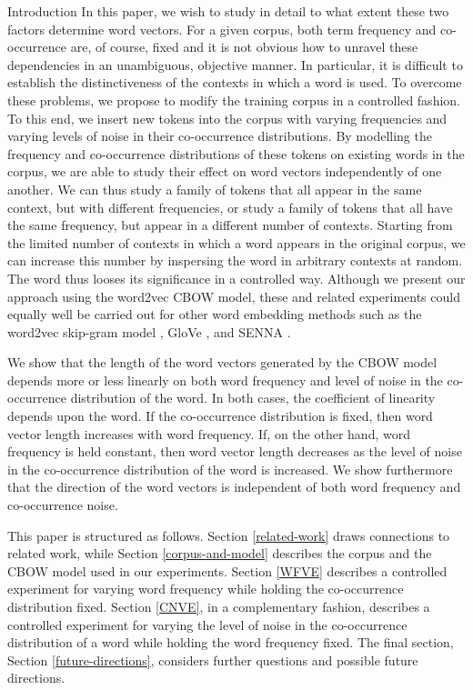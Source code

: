 \documentclass{article} %
\begin{document}
\begin{section}{Introduction}
In this paper, we wish to study in detail to what extent these two
factors determine word vectors.  For a given corpus, both term
frequency and co-occurrence are, of course, fixed and it is not obvious
how to unravel these dependencies in an unambiguous, objective manner.
In particular, it is difficult to establish the distinctiveness of the
contexts in which a word is used.  To overcome these problems, we
propose to modify the training corpus in a controlled fashion.  To
this end, we insert new tokens into the corpus with varying frequencies
and varying levels of noise in their co-occurrence distributions.  By
modelling the frequency and co-occurrence distributions of these tokens
on existing words in the corpus, we are able to study their effect on
word vectors independently of one another.  We can thus study a family
of tokens that all appear in the same context, but with different
frequencies, or study a family of tokens that all have the same
frequency, but appear in a different number of contexts.  Starting from
the limited number of contexts in which a word appears in the original
corpus, we can increase this number by inspersing the word in arbitrary
contexts at random.  The word thus looses its significance in a
controlled way.  Although we present our approach using the word2vec
CBOW model, these and related experiments could equally well be carried
out for other word embedding methods such as the word2vec skip-gram
model \cite{DistRepns,EfficientEstimation}, GloVe
\cite{pennington2014glove}, and SENNA \cite{collobert-2011}.

We show that the length of the word vectors generated by the CBOW model
depends more or less linearly on both word frequency and level of noise
in the co-occurrence distribution of the word.  In both cases, the
coefficient of linearity depends upon the word.  If the co-occurrence
distribution is fixed, then word vector length increases with word
frequency.  If, on the other hand, word frequency is held constant, then
word vector length decreases as the level of noise in the co-occurrence
distribution of the word is increased.  We show furthermore that the
direction of the word vectors is independent of both word frequency and
co-occurrence noise.

This paper is structured as follows.  Section \ref{related-work} draws
connections to related work, while Section \ref{corpus-and-model} describes
the corpus and the CBOW model used in our experiments.
Section \ref{WFVE} describes a controlled experiment for varying word
frequency while holding the co-occurrence distribution fixed.
Section \ref{CNVE}, in a complementary fashion, describes a controlled
experiment for varying the level of noise in the co-occurrence
distribution of a word while holding the word frequency fixed.  The
final section, Section \ref{future-directions}, considers further questions
and possible future directions.
\end{section}
\end{document}
